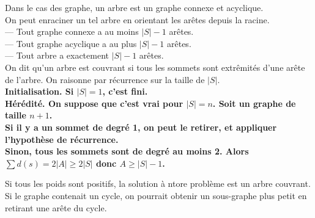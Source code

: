 \documentclass[french, 11pt]{article}
\begin{document}
\begin{defi}{}{}
    Dans le cas des graphe, un arbre est un graphe connexe et acyclique.\\
    On peut enraciner un tel arbre en orientant les arêtes depuis la racine.\\
    --- Tout graphe connexe a au moins $|S|-1$ arêtes.\\
    --- Tout graphe acyclique a au plus $|S|-1$ arêtes.\\
    --- Tout arbre a exactement $|S|-1$ arêtes.\\
    On dit qu'un arbre est couvrant si tous les sommets sont extrêmités d'une arête de l'arbre.
    \tcblower
    On raisonne par récurrence sur la taille de $|S|$.\\
    \bf{Initialisation.} Si $|S|=1$, c'est fini.\\
    \bf{Hérédité.} On suppose que c'est vrai pour $|S|=n$. Soit un graphe de taille $n+1$.\\
    Si il y a un sommet de degré 1, on peut le retirer, et appliquer l'hypothèse de récurrence.\\
    Sinon, tous les sommets sont de degré au moins 2. Alors $\sum d(s) = 2|A| \geq 2|S|$ donc $A\geq|S|-1$.
\end{defi}

\vspace*{-0.4cm}

\begin{prop}{}{}
    Si tous les poids sont positifs, la solution à ntore problème est un arbre couvrant.
    \tcblower
    Si le graphe contenait un cycle, on pourrait obtenir un sous-graphe plus petit en retirant une arête du cycle.
\end{prop}
\end{document}
